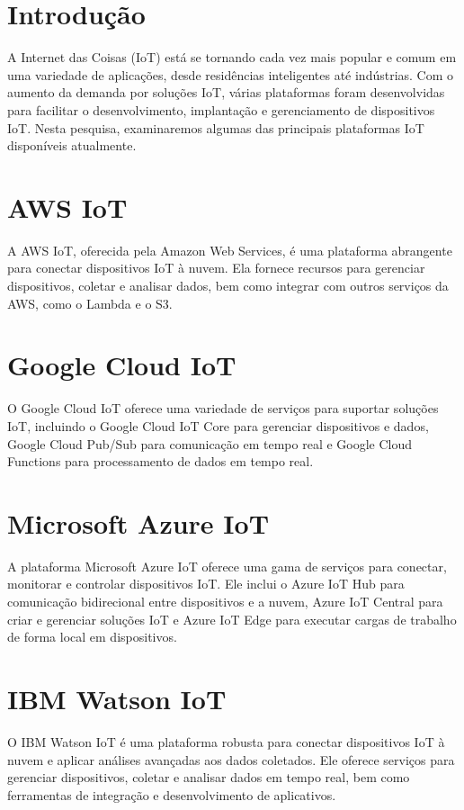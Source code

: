 \documentclass{ufersa}
\begin{document}
\maketitle
\section{Introdução}
A Internet das Coisas (IoT) está se tornando cada vez mais popular e comum em uma variedade de aplicações, desde residências inteligentes até indústrias. Com o aumento da demanda por soluções IoT, várias plataformas foram desenvolvidas para facilitar o desenvolvimento, implantação e gerenciamento de dispositivos IoT. Nesta pesquisa, examinaremos algumas das principais plataformas IoT disponíveis atualmente.

\section{AWS IoT}
A AWS IoT, oferecida pela Amazon Web Services, é uma plataforma abrangente para conectar dispositivos IoT à nuvem. Ela fornece recursos para gerenciar dispositivos, coletar e analisar dados, bem como integrar com outros serviços da AWS, como o Lambda e o S3.

\section{Google Cloud IoT}
O Google Cloud IoT oferece uma variedade de serviços para suportar soluções IoT, incluindo o Google Cloud IoT Core para gerenciar dispositivos e dados, Google Cloud Pub/Sub para comunicação em tempo real e Google Cloud Functions para processamento de dados em tempo real.

\section{Microsoft Azure IoT}
A plataforma Microsoft Azure IoT oferece uma gama de serviços para conectar, monitorar e controlar dispositivos IoT. Ele inclui o Azure IoT Hub para comunicação bidirecional entre dispositivos e a nuvem, Azure IoT Central para criar e gerenciar soluções IoT e Azure IoT Edge para executar cargas de trabalho de forma local em dispositivos.

\section{IBM Watson IoT}
O IBM Watson IoT é uma plataforma robusta para conectar dispositivos IoT à nuvem e aplicar análises avançadas aos dados coletados. Ele oferece serviços para gerenciar dispositivos, coletar e analisar dados em tempo real, bem como ferramentas de integração e desenvolvimento de aplicativos.
\end{document}

